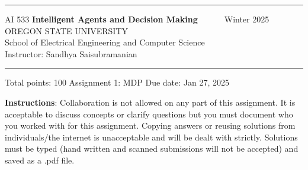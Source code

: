 \documentclass[11pt]{article}
\begin{document}
	
	\begin{center}
		\rule{7.3in}{2pt}
		{\large AI 533 \hfill {\bf Intelligent Agents and Decision Making~~~~~} \hfill Winter 2025}\\[2pt]
		OREGON STATE UNIVERSITY\\
		School of Electrical Engineering and Computer Science \\ [2pt]
		Instructor: Sandhya Saisubramanian\\
		\rule{7.3in}{2pt}
	\end{center}
	
	\vskip 0.2in
	\begin{center}
	\large Total points: 100 \hfill	{\large Assignment 1: MDP  } \hfill \large Due date: Jan 27, 2025
	\end{center}
	
	\vskip 0.2in
	
	\thispagestyle{empty}
	
	\textbf{Instructions}: Collaboration is not allowed on any part of this assignment. It is acceptable to discuss concepts or clarify questions but you must document who you worked with for this assignment. Copying answers or reusing solutions from individuals/the internet is unacceptable and will be dealt with strictly. 
	Solutions must be typed (hand written and scanned submissions will not be accepted) and saved as a .pdf file. 
	
\end{document}
